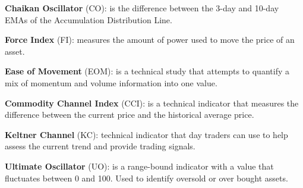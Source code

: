 \textbf{Chaikan Oscillator} (CO): is the difference between the 3-day and 10-day EMAs of the Accumulation Distribution Line.


\textbf{Force Index }(FI): measures the amount of power used to move the price of an asset.

\textbf{Ease of Movement} (EOM): is a technical study that attempts to quantify a mix of momentum and volume information into one value.


\textbf{Commodity Channel Index }(CCI): is a technical indicator that measures the difference between the current price and the historical average price.

\textbf{Keltner Channel }(KC): technical indicator that day traders can use to help assess the current trend and provide trading signals.

\textbf{Ultimate Oscillator} (UO): is a range-bound indicator with a value that fluctuates between 0 and 100.  Used to identify oversold or over bought assets.


